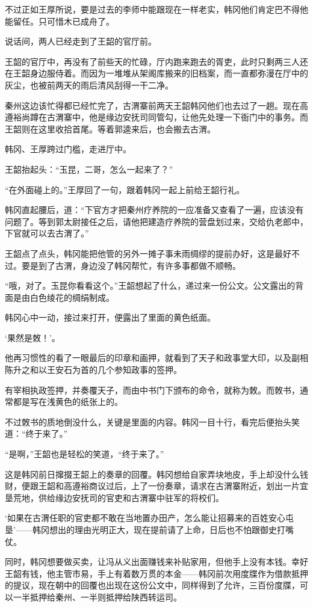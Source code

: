 不过正如王厚所说，要是过去的李师中能跟现在一样老实，韩冈他们肯定巴不得他能留任。只可惜木已成舟了。

说话间，两人已经走到了王韶的官厅前。

王韶的官厅中，再没有了前些天的忙碌，厅内跑来跑去的胥吏，此时只剩两三人还在王韶身边服侍着。而因为一堆堆从架阁库搬来的旧档案，而一直都弥漫在厅中的灰尘，也被前两天的雨后清风刮得一干二净。

秦州这边该忙得都已经忙完了，古渭寨前两天王韶韩冈他们也去过了一趟。现在高遵裕尚蹲在古渭寨中，他是缘边安抚司同管勾，让他先处理一下衙门中的事务。而王韶则在这里收拾首尾。等着郭逵来后，也会搬去古渭。

韩冈、王厚跨过门槛，走进厅中。

王韶抬起头：“玉昆，二哥，怎么一起来了？”

“在外面碰上的。”王厚回了一句，跟着韩冈一起上前给王韶行礼。

韩冈直起腰后，道：“下官方才把秦州疗养院的一应准备又查看了一遍，应该没有问题了。等到郭太尉接任之后，请他把建造疗养院的营盘划过来，交给仇老郎中，下官就可以去古渭了。”

王韶点了点头，韩冈能把他管的另外一摊子事未雨绸缪的提前办好，这是最好不过。要是到了古渭，身边没了韩冈帮忙，有许多事都做不顺畅。

“哦，对了。玉昆你看看这个。”王韶想起了什么，递过来一份公文。公文露出的背面是由白色绫花的绸绢制成。

韩冈心中一动，接过来打开，便露出了里面的黄色纸面。

‘果然是敇！’。

他再习惯性的看了一眼最后的印章和画押，就看到了天子和政事堂大印，以及副相陈升之和以王安石为首的几个参知政事的签押。

有宰相执政签押，并奏覆天子，而由中书门下颁布的命令，就称为敇。而敇书，通常都是写在浅黄色的纸张上的。

不过敇书的质地倒没什么，关键是里面的内容。韩冈一目十行，看完后便抬头笑道：“终于来了。”

“是啊，”王韶也是轻松的笑道，“终于来了。”

这是韩冈前日撺掇王韶上的奏章的回覆。韩冈想给自家弄块地皮，手上却没什么钱财，便跟王韶和高遵裕商议过后，上了一份奏章，请求在古渭寨附近，划出一片宜垦荒地，供给缘边安抚司的官吏和古渭寨中驻军的将校们。

‘如果在古渭任职的官吏都不敢在当地置办田产，怎么能让招募来的百姓安心屯垦’——韩冈想出的理由光明正大，现在提前请了上命，日后也不怕跟御史打嘴仗。

同时，韩冈想要做买卖，让冯从义出面赚钱来补贴家用，但他手上没有本钱。幸好王韶有钱，他主管市易，手上有着数万贯的本金——韩冈前次用度牒作为借款抵押的提议，现在朝中的回覆也出现在这份公文中，同样得到了允许，三百份度牒，可以一半抵押给秦州、一半则抵押给陕西转运司。

